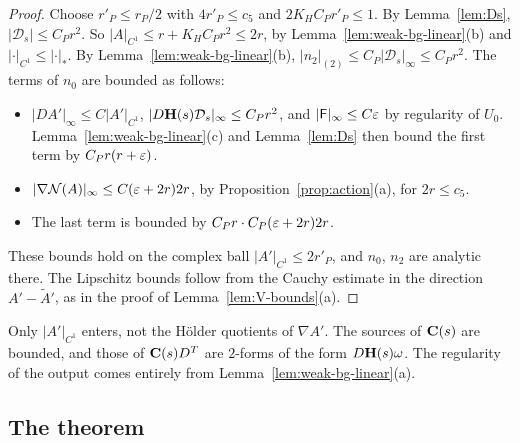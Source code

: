 \begin{proof}
Choose $r'_P\le r_P/2$ with $4r'_P\le c_5$ and $2K_HC_Pr'_P\le1$. By Lemma~\ref{lem:Ds}, $|\mathcal D_s|\le C_Pr^2$. So $|A|_{C^1}\le r+K_HC_Pr^2\le2r$, by Lemma~\ref{lem:weak-bg-linear}(b) and $|\cdot|_{C^1}\le|\cdot|_*$. By Lemma~\ref{lem:weak-bg-linear}(b), $|n_2|_{(2)}\le C_P|\mathcal D_s|_\infty\le C_Pr^2$. The terms of $n_0$ are bounded as follows:
\begin{itemize}
\item $|DA'|_\infty\le C|A'|_{C^1}$, $|D\mathbf H(s)\mathcal D_s|_\infty\le C_Pr^2$, and $|\mathsf F|_\infty\le C\varepsilon$ by regularity of $U_0$. Lemma~\ref{lem:weak-bg-linear}(c) and Lemma~\ref{lem:Ds} then bound the first term by $C_Pr(r+\varepsilon)$.
\item $|\nabla\mathcal N(A)|_\infty\le C(\varepsilon+2r)2r$, by Proposition~\ref{prop:action}(a), for $2r\le c_5$.
\item The last term is bounded by $C_Pr\cdot C_P(\varepsilon+2r)2r$.
\end{itemize}
These bounds hold on the complex ball $|A'|_{C^1}\le2r'_P$, and $n_0$, $n_2$ are analytic there. The Lipschitz bounds follow from the Cauchy estimate in the direction $A'-\tilde A'$, as in the proof of Lemma~\ref{lem:V-bounds}(a).
\end{proof}

Only $|A'|_{C^1}$ enters, not the H\"older quotients of $\nabla A'$. The sources of $\mathbf C(s)$ are bounded, and those of $\mathbf C(s)D^T$ are $2$-forms of the form $D\mathbf H(s)\omega$. The regularity of the output comes entirely from Lemma~\ref{lem:weak-bg-linear}(a).

\subsection{The theorem}

